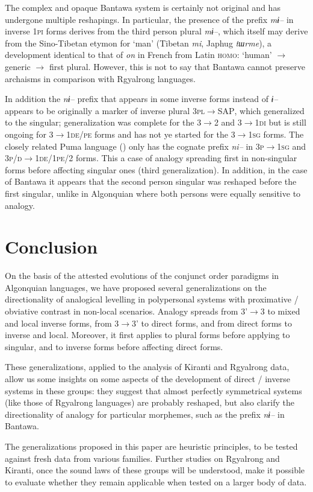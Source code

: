 \documentclass[twoside,a4paper,11pt]{article}
\newcommand{\ipa}[1]{{\phon\textit{#1}}}
\newcommand{\Σ}{\greek{Σ}}
\begin{document}
The complex and opaque Bantawa system is certainly not original and   has undergone multiple reshapings. In particular, the presence of the prefix \ipa{mɨ--} in inverse \textsc{1pi} forms derives from the third person plural \ipa{mɨ--}, which itself may derive from the Sino-Tibetan etymon for `man' (Tibetan \ipa{mi}, Japhug \ipa{tɯrme}), a development identical to that of \ipa{on} in French from Latin \textsc{homo}: `human' $\rightarrow$ generic $\rightarrow$ first plural. However, this is not to say that Bantawa cannot preserve archaisms in comparison with Rgyalrong languages.


 In addition the \ipa{nɨ--} prefix that appears in some inverse forms instead of \ipa{ɨ--} appears to be originally a marker of inverse plural \textsc{3pl$\rightarrow$SAP}, which generalized to the singular; generalization was complete for the 3$\rightarrow$2 and 3$\rightarrow$\textsc{1di} but is still ongoing for \textsc{3$\rightarrow$1de/pe} forms and has not ye started for the \textsc{3$\rightarrow$1sg} forms. The closely related Puma language (\citealt{bickel07puma}) only has the cognate prefix \ipa{ni--} in \textsc{3p$\rightarrow$1sg} and \textsc{3p/d$\rightarrow$1de/1pe/2} forms. This a case of analogy spreading first in non-singular forms before affecting singular ones (third generalization). In addition, in the case of Bantawa it appears that the second person singular was reshaped before the first singular, unlike in Algonquian where both persons were equally sensitive to analogy.

 
 
 

\section{Conclusion}

On the basis of the attested evolutions of the conjunct order paradigms in Algonquian languages, we have proposed several generalizations on the directionality of analogical levelling in polypersonal systems with proximative / obviative contrast in non-local scenarios. Analogy spreads from  3'$\rightarrow$3 to mixed and local inverse forms, from 3$\rightarrow$3' to direct forms, and from direct forms to inverse and local. Moreover, it first applies to plural forms before applying to singular, and to inverse forms before affecting direct forms.

These generalizations, applied to the analysis of Kiranti and Rgyalrong data, allow us some insights on some aspects of the development of direct / inverse systems in these groups: they suggest that almost perfectly symmetrical systems (like those of Rgyalrong languages) are probably reshaped, but also clarify the directionality of analogy for particular morphemes, such as the prefix \ipa{nɨ--} in Bantawa.


The generalizations proposed in this paper are heuristic principles, to be tested against fresh data from various families. Further studies on Rgyalrong and Kiranti, once the sound laws of these groups will be understood, make it possible to evaluate whether they remain applicable when tested on a larger body of data.

 
 
\end{document}
